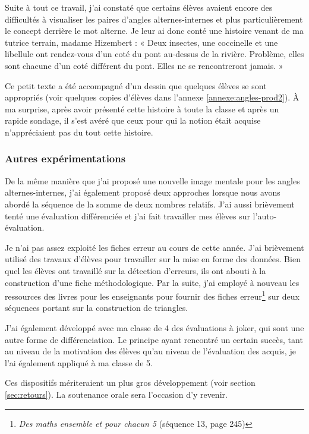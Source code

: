 Suite à tout ce travail, j'ai constaté que certains élèves avaient encore des difficultés à visualiser les paires d'angles alternes-internes et plus particulièrement le concept derrière le mot alterne. Je leur ai donc conté une histoire venant de ma tutrice terrain, madame Hizembert : « Deux insectes, une coccinelle et une libellule ont rendez-vous d'un coté du pont au-dessus de la rivière. Problème, elles sont chacune d'un coté différent du pont. Elles ne se rencontreront jamais. »

Ce petit texte a été accompagné d'un dessin que quelques élèves se sont appropriés (voir quelques copies d'élèves dans l'annexe \ref{annexe:angles-prod2}). À ma surprise, après avoir présenté cette histoire à toute la classe et après un rapide sondage, il s'est avéré que ceux pour qui la notion était acquise n'appréciaient pas du tout cette histoire.

\subsubsection{Autres expérimentations}

De la même manière que j'ai proposé une nouvelle image mentale pour les angles alternes-internes, j'ai également proposé deux approches lorsque nous avons abordé la séquence de la somme de deux nombres relatifs. J'ai aussi brièvement tenté une évaluation différenciée et j'ai fait travailler mes élèves sur l'auto-évaluation.

Je n'ai pas assez exploité les fiches erreur au cours de cette année. J'ai brièvement utilisé des travaux d'élèves pour travailler sur la mise en forme des données. Bien quel les élèves ont travaillé sur la détection d'erreurs, ils ont abouti à la construction d'une fiche méthodologique. Par la suite, j'ai employé à nouveau les ressources des livres pour les enseignants pour fournir des fiches erreur\footnote{\textit{Des maths ensemble et pour chacun 5} \cite{mepcc} (séquence 13, page 245)} sur deux séquences portant sur la construction de triangles.

J'ai également développé avec ma classe de 4 des évaluations à joker, qui sont une autre forme de différenciation. Le principe ayant rencontré un certain succès, tant au niveau de la motivation des élèves qu'au niveau de l'évaluation des acquis, je l'ai également appliqué à ma classe de 5.

Ces dispositifs mériteraient un plus gros développement (voir section \ref{sec:retours}). La soutenance orale sera l'occasion d'y revenir.

